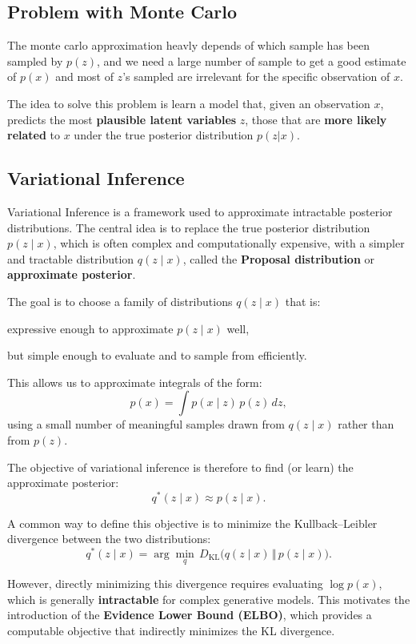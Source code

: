 \subsection{Problem with Monte Carlo}
The monte carlo approximation heavly depends of which sample has been sampled by $p(z)$, and we need a large number of sample to get a good estimate of $p(x)$ and most of $z$'s sampled are irrelevant for the specific observation of $x$.

The idea to solve this problem is learn a model that, given an observation $x$, predicts the most \textbf{plausible latent variables} $z$, those that are \textbf{more likely related} to $x$ under the true posterior distribution $p(z|x)$.

\subsection{Variational Inference}

Variational Inference is a framework used to approximate intractable posterior distributions.  
The central idea is to replace the true posterior distribution $p(z \mid x)$, which is often complex and computationally expensive, with a simpler and tractable distribution $q(z \mid x)$, called the \textbf{Proposal distribution} or \textbf{approximate posterior}.

The goal is to choose a family of distributions $q(z \mid x)$ that is:
\begin{compactitemize}
    \item expressive enough to approximate $p(z \mid x)$ well,
    \item but simple enough to evaluate and to sample from efficiently.
\end{compactitemize}

This allows us to approximate integrals of the form:
\[
p(x) = \int p(x \mid z)\, p(z)\, dz,
\]
using a small number of meaningful samples drawn from $q(z \mid x)$ rather than from $p(z)$.

The objective of variational inference is therefore to find (or learn) the approximate posterior:
\[
q^\ast(z \mid x) \approx p(z \mid x).
\]

A common way to define this objective is to minimize the Kullback–Leibler divergence between the two distributions:
\[
q^\ast(z \mid x)
= \arg\min_{q} \, D_{\mathrm{KL}}\bigl(q(z \mid x)\, \Vert\, p(z \mid x)\bigr).
\]

However, directly minimizing this divergence requires evaluating $\log p(x)$, which is generally \textbf{intractable} for complex generative models.  
This motivates the introduction of the \textbf{Evidence Lower Bound (ELBO)}, which provides a computable objective that indirectly minimizes the KL divergence.

